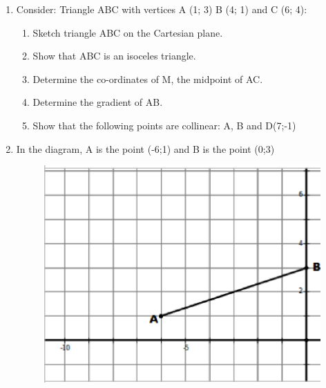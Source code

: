 \begin{enumerate}[noitemsep, label=\textbf{\arabic*}. ]
\item 
Consider: Triangle ABC with vertices A (1; 3) B (4; 1) and C (6; 4):
\label{m39167*id9173123}\begin{enumerate}[noitemsep, label=\textbf{\alph*}. ] 
            \item Sketch triangle ABC on the Cartesian plane. \item Show that ABC is an isoceles triangle.\item Determine the co-ordinates of M, the midpoint of AC.\item Determine the gradient of AB.\item Show that the following points are collinear: A, B and D(7;-1)\end{enumerate}
                
\item In the diagram, A is the point (-6;1) and B is the point (0;3)

    \setcounter{subfigure}{0}


	\begin{figure}[H] %
    \begin{center}
    \label{m39167*id740344!!!underscore!!!media}\label{m39167*id740344!!!underscore!!!printimage}\includegraphics{col11306.imgs/m39167_MG10C14_5.png} %
        
      \vspace{2pt}
    \vspace{.1in}
    
    \end{center}


\end{figure}
\end{enumerate}
